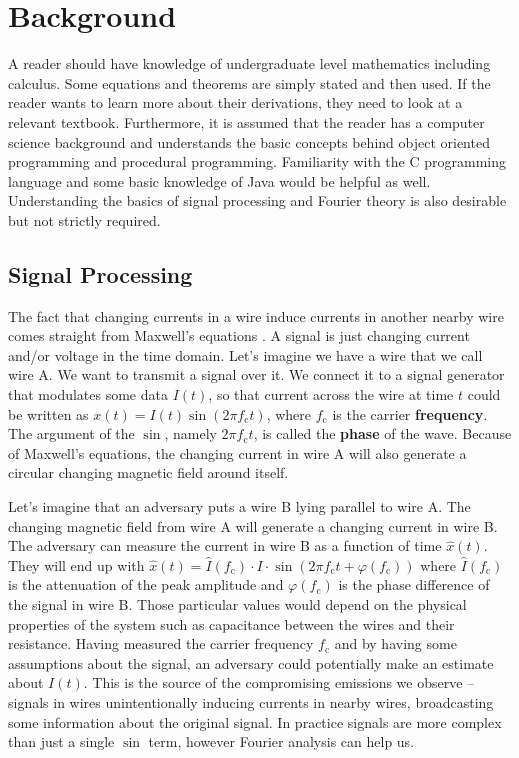 \documentclass[a4paper,12pt,twoside,openright]{report}
\begin{document}
\chapter{Background}
\label{chap:background}

A reader should have knowledge of undergraduate level mathematics including calculus. Some equations and theorems are simply stated and then used. If the reader wants to learn more about their derivations, they need to look at a relevant textbook. Furthermore, it is assumed that the reader has a computer science background and understands the basic concepts behind object oriented programming and procedural programming. Familiarity with the C programming language and some basic knowledge of Java would be helpful as well. Understanding the basics of signal processing and Fourier theory is also desirable but not strictly required.

\section{Signal Processing} 

The fact that changing currents in a wire induce currents in another nearby wire comes straight from Maxwell's equations \cite{maxwell1881treatise}. A signal is just changing current and/or voltage in the time domain. Let's imagine we have a wire that we call wire A. We want to transmit a signal over it. We connect it to a signal generator that modulates some data $I(t)$, so that current across the wire at time $t$ could be written as $x(t) = I(t) \sin(2\pi f_\text{c} t)$, where $f_\text{c}$ is the carrier \textbf{frequency}. The argument of the $\sin$, namely $2\pi f_\text{c} t$, is called the \textbf{phase} of the wave. Because of Maxwell's equations, the changing current in wire A will also generate a circular changing magnetic field around itself.

Let's imagine that an adversary puts a wire B lying parallel to wire A. The changing magnetic field from wire A will generate a changing current in wire B. The adversary can measure the current in wire B as a function of time $\hat{x}(t)$. They will end up with $\hat{x}(t) = \hat{I}(f_\text{c}) \cdot I  \cdot \sin( 2\pi f_\text{c} t + \varphi(f_\text{c}))$ where $\hat{I}(f_\text{c})$ is the attenuation of the peak amplitude and $\varphi( f_\text{c})$ is the phase difference of the signal in wire B. Those particular values would depend on the physical properties of the system such as capacitance between the wires and their resistance. Having measured the carrier frequency $f_\text{c}$ and by having some assumptions about the signal, an adversary could potentially make an estimate about $I(t)$. This is the source of the compromising emissions we observe -- signals in wires unintentionally inducing currents in nearby wires, broadcasting some information about the original signal. In practice signals are more complex than just a single $\sin$ term, however Fourier analysis can help us.
\end{document}
